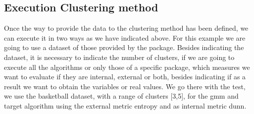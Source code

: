 \subsection*{Execution Clustering method}

Once the way to provide the data to the clustering method has been defined, we can execute it in two ways as we have indicated above. For this example we are going to use a dataset of those provided by the package. Besides indicating the dataset, it is necessary to indicate the number of clusters, if we are going to execute all the algorithms or only those of a specific package, which measures we want to evaluate if they are internal, external or both, besides indicating if as a result we want to obtain the variables or real values. We go there with the test, we use the basketball dataset, with a range of clusters [3,5], for the gmm and target algorithm using the external metric entropy and as internal metric dunn.

